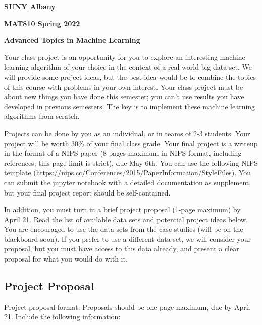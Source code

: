 \documentclass[a4paper,10pt]{article}
\begin{document}
\begin{center}

\textbf{SUNY Albany}

\textbf{MAT810 Spring 2022}

\textbf{Advanced Topics in Machine Learning}


\end{center}


Your class project is an opportunity for you to explore an interesting machine learning  algorithm of your choice in the context of a real-world big data set.  We will provide some project ideas, but the best idea would be to combine the topics of this course with problems in your own interest. Your class project must be about new things you have done this semester; you can't use results you have developed in previous semesters. The key is to implement these machine learning algorithms from
scratch.

Projects can be done by you as an individual, or in teams of 2-3 students. Your project will be worth 30\% of your final class grade. Your final project is a writeup in the format of a NIPS paper (8 pages maximum in NIPS format, including references; this page limit is strict), due May 6th. You can use the following NIPS template (\url{https://nips.cc/Conferences/2015/PaperInformation/StyleFiles}). You can submit the jupyter notebook with a detailed documentation as supplement, but your final project report should be self-contained. 

In addition, you must turn in a brief project proposal (1-page maximum) by April 21.  Read the list of available data sets and potential project ideas below.  You are encouraged to use the data sets from the case studies (will be on the blackboard soon). If you prefer to use a different data set, we will consider your proposal, but you must have access to this data already, and present a clear proposal for what you would do with it. 

\subsection*{Project Proposal}
Project proposal format:  Proposals should be one page maximum, due by April 21.
 Include the following information:
\end{document}
